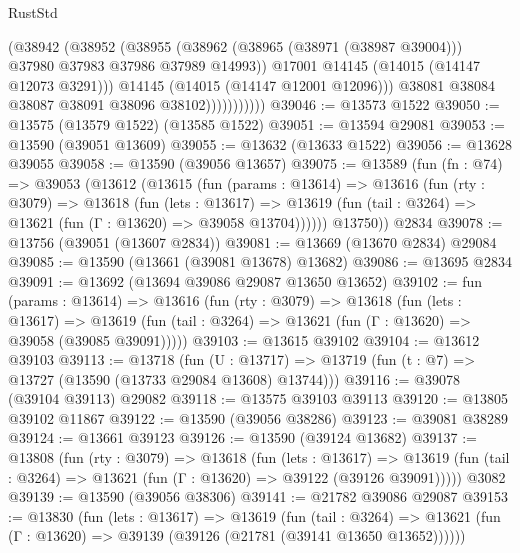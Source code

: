 \begin{lexlean}{RustStd}
\begin{coremodule}
                          (@38942
                            (@38952
                              (@38955
                                (@38962
                                  (@38965 (@38971 (@38987 @39004)))
                                  @37980
                                  @37983
                                  @37986
                                  @37989
                                  @14993))
                              @17001
                              @14145
                              (@14015 (@14147 @12073 @3291)))
                            @14145
                            (@14015 (@14147 @12001 @12096)))
                          @38081
                          @38084
                          @38087
                          @38091
                          @38096
                          @38102)))))))))))
@39046 := @13573 @1522
@39050 := @13575 (@13579 @1522) (@13585 @1522)
@39051 := @13594 @29081
@39053 := @13590 (@39051 @13609)
@39055 := @13632 (@13633 @1522)
@39056 := @13628 @39055
@39058 := @13590 (@39056 @13657)
@39075 := @13589
    (fun (fn : @74) =>
    @39053
      (@13612
        (@13615
          (fun (params : @13614) =>
          @13616
            (fun (rty : @3079) =>
            @13618
              (fun (lets : @13617) =>
              @13619 (fun (tail : @3264) => @13621 (fun (Γ : @13620) => @39058 @13704))))))
        @13750))
    @2834
@39078 := @13756 (@39051 (@13607 @2834))
@39081 := @13669 (@13670 @2834) @29084
@39085 := @13590 (@13661 (@39081 @13678) @13682)
@39086 := @13695 @2834
@39091 := @13692 (@13694 @39086 @29087 @13650 @13652)
@39102 := fun (params : @13614) =>
  @13616
    (fun (rty : @3079) =>
    @13618
      (fun (lets : @13617) =>
      @13619 (fun (tail : @3264) => @13621 (fun (Γ : @13620) => @39058 (@39085 @39091)))))
@39103 := @13615 @39102
@39104 := @13612 @39103
@39113 := @13718
    (fun (U : @13717) => @13719 (fun (t : @7) => @13727 (@13590 (@13733 @29084 @13608) @13744)))
@39116 := @39078 (@39104 @39113) @29082
@39118 := @13575 @39103 @39113
@39120 := @13805 @39102 @11867
@39122 := @13590 (@39056 @38286)
@39123 := @39081 @38289
@39124 := @13661 @39123
@39126 := @13590 (@39124 @13682)
@39137 := @13808
    (fun (rty : @3079) =>
    @13618
      (fun (lets : @13617) =>
      @13619 (fun (tail : @3264) => @13621 (fun (Γ : @13620) => @39122 (@39126 @39091)))))
    @3082
@39139 := @13590 (@39056 @38306)
@39141 := @21782 @39086 @29087
@39153 := @13830
    (fun (lets : @13617) =>
    @13619
      (fun (tail : @3264) =>
      @13621 (fun (Γ : @13620) => @39139 (@39126 (@21781 (@39141 @13650 @13652))))))

\end{coremodule}
\end{lexlean}
